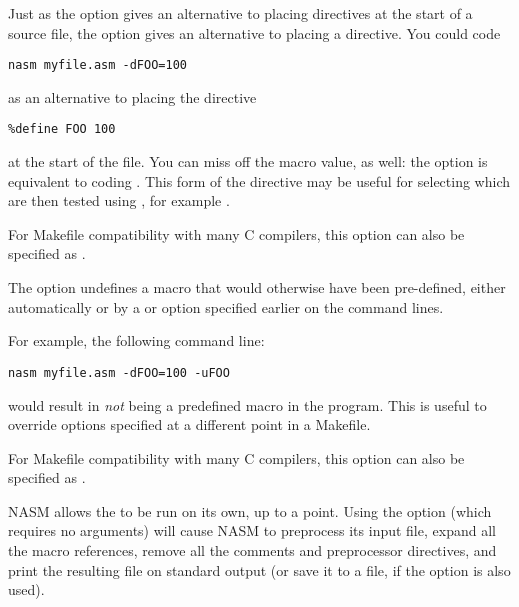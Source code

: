 
Just as the  option gives an alternative to placing
 directives at the start of a source file, the 
option gives an alternative to placing a  directive. You
could code

\begin{lstlisting}
nasm myfile.asm -dFOO=100
\end{lstlisting}

as an alternative to placing the directive

\begin{lstlisting}
%define FOO 100
\end{lstlisting}

at the start of the file. You can miss off the macro value, as well:
the option  is equivalent to coding .
This form of the directive may be useful for selecting  which are then tested using , for example .

For Makefile compatibility with many C compilers, this option can also
be specified as .


The  option undefines a macro that would otherwise
have been pre-defined, either automatically or by a  or 
option specified earlier on the command lines.

For example, the following command line:

\begin{lstlisting}
nasm myfile.asm -dFOO=100 -uFOO
\end{lstlisting}

would result in  \emph{not} being a predefined macro in the
program. This is useful to override options specified at a different
point in a Makefile.

For Makefile compatibility with many C compilers, this option can also
be specified as .


NASM allows the  to be run on its own, up to a
point. Using the  option (which requires no arguments) will
cause NASM to preprocess its input file, expand all the macro references,
remove all the comments and preprocessor directives, and print the resulting
file on standard output (or save it to a file, if the  option
is also used).

